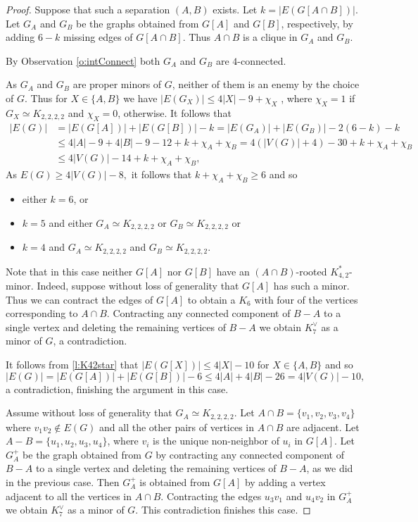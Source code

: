 \documentclass[10pt,a4paper]{amsart}
\begin{document}
	\begin{proof} Suppose that such a separation $(A,B)$ exists. Let $k=|E(G[A \cap B])|$. Let $G_A$ and $G_B$ be the graphs obtained from $G[A]$ and $G[B]$, respectively, by adding $6-k$ missing edges of $G[A \cap B]$. Thus $A \cap B$ is a clique in $G_A$ and $G_B$.

By Observation \ref{o:intConnect} both $G_A$ and $G_B$ are $4$-connected. 	
		
As $G_A$ and $G_B$ are proper minors of $G$, neither of them is an enemy by the choice of $G$. 	Thus for $X \in \{A,B\}$ we have $|E(G_X)| \leq 4|X| - 9+\chi_X$ , where  $\chi_X =1$ if $G_X \simeq K_{2,2,2,2}$  and $\chi_X=0$, otherwise.
It follows that   \begin{align*}
	|E(G)| &= |E(G[A])| + |E(G[B])| -k = |E(G_A)|+|E(G_B)| -2(6-k)-k \\
	&\leq 4|A| - 9  + 4|B| - 9 - 12 + k + \chi_A +\chi_B 
	= 4(|V(G)| + 4) - 30 + k  + \chi_A +\chi_B \\
	&\leq 4|V(G)| - 14 + k  + \chi_A +\chi_B,
\end{align*} 
As $E(G) \geq  4|V(G)| - 8,$ it follows that $k+\chi_A +\chi_B \geq 6$ and so \begin{itemize} \item either $k = 6$, or \item $k=5$ and either  $G_A \simeq K_{2,2,2,2}$ or $G_B \simeq K_{2,2,2,2}$
 or \item $k=4$ and  $G_A \simeq K_{2,2,2,2}$ and $G_B \simeq K_{2,2,2,2}$.
 \end{itemize}
 Note that in this case neither $G[A]$ nor $G[B]$ have an $(A \cap B)$-rooted $K^*_{4,2}$-minor.
 Indeed, suppose without loss of generality that $G[A]$ has such a minor. Thus we can contract the edges of $G[A]$ to obtain a $K_6$ with four of the vertices corresponding to $A \cap B$.  Contracting any connected component of $B-A$ to a single vertex and deleting the remaining vertices of $B-A$ we obtain $K_7^{\vee}$ as a minor of $G$, a contradiction.
 
  It follows from \cref{l:K42star} that $|E(G[X])| \leq 4|X|- 10$ for $X \in \{A,B\}$ and so $$
  	|E(G)| = |E(G[A])| + |E(G[B])| -6 
  	\leq 4|A|  + 4|B| - 26 
  = 4|V(G)| - 10,
$$
a contradiction, finishing the argument in this case.

\vskip 5pt 
 Assume without loss of generality that    $G_A \simeq K_{2,2,2,2}$. Let $A \cap B = \{v_1,v_2,v_3,v_4\}$ where $v_1v_2 \not \in E(G)$ and all the other pairs of vertices in $A \cap B$ are adjacent. Let $A - B = \{u_1,u_2,u_3,u_4\}$, where $v_i$ is the unique non-neighbor of $u_i$ in $G[A]$. Let $G^{+}_A$ be the graph obtained from $G$ by contracting any connected component of $B-A$ to a single vertex and deleting the remaining vertices of $B-A$, as we did in the previous case. Then $G^{+}_A$ is obtained from $G[A]$ by adding a vertex adjacent to all the vertices in  $A \cap B$. Contracting the edges $u_3v_1$ and $u_4v_2$ in $G^{+}_A$ we obtain $K_7^{\vee}$ as a minor of $G$. This contradiction finishes this case.
 

\end{proof}
\end{document}
